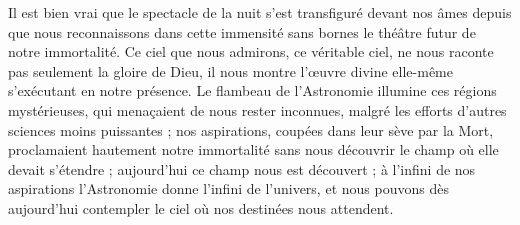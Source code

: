 \documentclass[a4paper, 11pt, oneside]{article}
\begin{document}
Il est bien vrai que le spectacle de la nuit s'est transfiguré devant nos âmes depuis que nous reconnaissons dans cette immensité sans bornes le théâtre futur de notre immortalité. Ce ciel que nous admirons, ce véritable ciel, ne nous raconte pas seulement la gloire de Dieu, il nous montre l'œuvre divine elle-même s'exécutant en notre présence. Le flambeau de l'Astronomie illumine ces régions mystérieuses, qui menaçaient de nous rester inconnues, malgré les efforts d'autres sciences moins puissantes ; nos aspirations, coupées dans leur sève par la Mort, proclamaient hautement notre immortalité sans nous découvrir le champ où elle devait s'étendre ; aujourd'hui ce champ nous est découvert ; à l'infini de nos aspirations l'Astronomie donne l'infini de l'univers, et nous pouvons dès aujourd'hui contempler le ciel où nos destinées nous attendent.
\end{document}
